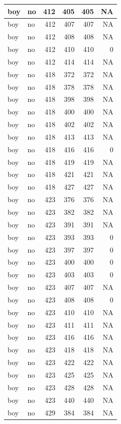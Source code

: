 \documentclass[man]{apa6}
\begin{document}
\begin{tabular}{l|l|r|r|r|r}
\hline
boy & no & 412 & 405 & 405 & NA\\
\hline
boy & no & 412 & 407 & 407 & NA\\
\hline
boy & no & 412 & 408 & 408 & NA\\
\hline
boy & no & 412 & 410 & 410 & 0\\
\hline
boy & no & 412 & 414 & 414 & NA\\
\hline
boy & no & 418 & 372 & 372 & NA\\
\hline
boy & no & 418 & 378 & 378 & NA\\
\hline
boy & no & 418 & 398 & 398 & NA\\
\hline
boy & no & 418 & 400 & 400 & NA\\
\hline
boy & no & 418 & 402 & 402 & NA\\
\hline
boy & no & 418 & 413 & 413 & NA\\
\hline
boy & no & 418 & 416 & 416 & 0\\
\hline
boy & no & 418 & 419 & 419 & NA\\
\hline
boy & no & 418 & 421 & 421 & NA\\
\hline
boy & no & 418 & 427 & 427 & NA\\
\hline
boy & no & 423 & 376 & 376 & NA\\
\hline
boy & no & 423 & 382 & 382 & NA\\
\hline
boy & no & 423 & 391 & 391 & NA\\
\hline
boy & no & 423 & 393 & 393 & 0\\
\hline
boy & no & 423 & 397 & 397 & 0\\
\hline
boy & no & 423 & 400 & 400 & 0\\
\hline
boy & no & 423 & 403 & 403 & 0\\
\hline
boy & no & 423 & 407 & 407 & NA\\
\hline
boy & no & 423 & 408 & 408 & 0\\
\hline
boy & no & 423 & 410 & 410 & NA\\
\hline
boy & no & 423 & 411 & 411 & NA\\
\hline
boy & no & 423 & 416 & 416 & NA\\
\hline
boy & no & 423 & 418 & 418 & NA\\
\hline
boy & no & 423 & 422 & 422 & NA\\
\hline
boy & no & 423 & 425 & 425 & NA\\
\hline
boy & no & 423 & 428 & 428 & NA\\
\hline
boy & no & 423 & 440 & 440 & NA\\
\hline
boy & no & 429 & 384 & 384 & NA\\

\end{tabular}
\end{document}
